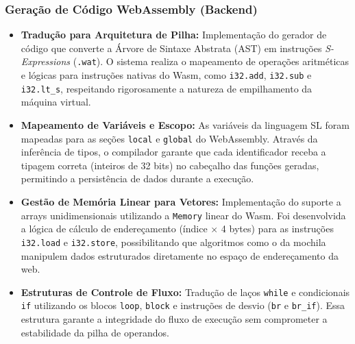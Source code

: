 \documentclass[12pt,a4paper]{article}
\begin{document}
\subsubsection{Geração de Código WebAssembly (Backend)}
\begin{itemize}
    \item \textbf{Tradução para Arquitetura de Pilha:} Implementação do gerador de código que converte a Árvore de Sintaxe Abstrata (AST) em instruções \textit{S-Expressions} (\texttt{.wat}). O sistema realiza o mapeamento de operações aritméticas e lógicas para instruções nativas do Wasm, como \texttt{i32.add}, \texttt{i32.sub} e \texttt{i32.lt\_s}, respeitando rigorosamente a natureza de empilhamento da máquina virtual.
    
    \item \textbf{Mapeamento de Variáveis e Escopo:} As variáveis da linguagem SL foram mapeadas para as seções \texttt{local} e \texttt{global} do WebAssembly. Através da inferência de tipos, o compilador garante que cada identificador receba a tipagem correta (inteiros de 32 bits) no cabeçalho das funções geradas, permitindo a persistência de dados durante a execução.
    
    \item \textbf{Gestão de Memória Linear para Vetores:} Implementação do suporte a arrays unidimensionais utilizando a \texttt{Memory} linear do Wasm. Foi desenvolvida a lógica de cálculo de endereçamento (índice $\times$ 4 bytes) para as instruções \texttt{i32.load} e \texttt{i32.store}, possibilitando que algoritmos como o da mochila manipulem dados estruturados diretamente no espaço de endereçamento da web.
    
    \item \textbf{Estruturas de Controle de Fluxo:} Tradução de laços \texttt{while} e condicionais \texttt{if} utilizando os blocos \texttt{loop}, \texttt{block} e instruções de desvio (\texttt{br} e \texttt{br\_if}). Essa estrutura garante a integridade do fluxo de execução sem comprometer a estabilidade da pilha de operandos.
\end{itemize}
\end{document}
